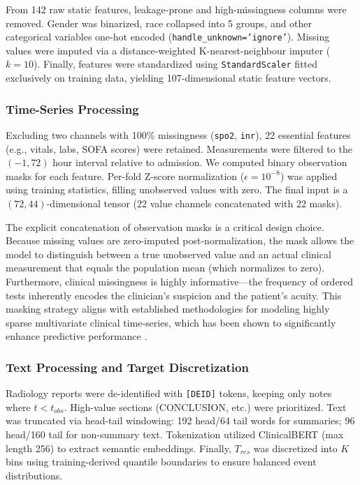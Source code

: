 \documentclass[10pt, a4paper]{article}
\begin{document}
From 142 raw static features, leakage-prone and high-missingness columns were removed. Gender was binarized, race collapsed into 5 groups, and other categorical variables one-hot encoded (\texttt{handle\_unknown='ignore'}). Missing values were imputed via a distance-weighted K-nearest-neighbour imputer ($k = 10$). Finally, features were standardized using \texttt{StandardScaler} fitted exclusively on training data, yielding 107-dimensional static feature vectors.

\subsubsection{Time-Series Processing}
Excluding two channels with 100\% missingness (\texttt{spo2}, \texttt{inr}), 22 essential features (e.g., vitals, labs, SOFA scores) were retained. Measurements were filtered to the $(-1, 72)$ hour interval relative to admission. We computed binary observation masks for each feature. Per-fold Z-score normalization ($\epsilon = 10^{-8}$) was applied using training statistics, filling unobserved values with zero. The final input is a $(72, 44)$-dimensional tensor (22 value channels concatenated with 22 masks).

The explicit concatenation of observation masks is a critical design choice. Because missing values are zero-imputed post-normalization, the mask allows the model to distinguish between a true unobserved value and an actual clinical measurement that equals the population mean (which normalizes to zero). Furthermore, clinical missingness is highly informative—the frequency of ordered tests inherently encodes the clinician's suspicion and the patient's acuity. This masking strategy aligns with established methodologies for modeling highly sparse multivariate clinical time-series, which has been shown to significantly enhance predictive performance \cite{lipton2016directly, che2018recurrent}.

\subsubsection{Text Processing and Target Discretization}
Radiology reports were de-identified with \texttt{[DEID]} tokens, keeping only notes where $t < t_{obs}$. High-value sections (CONCLUSION, etc.) were prioritized. Text was truncated via head-tail windowing: 192 head/64 tail words for summaries; 96 head/160 tail for non-summary text. Tokenization utilized ClinicalBERT (max length 256) to extract semantic embeddings. Finally, $T_{res}$ was discretized into $K$ bins using training-derived quantile boundaries to ensure balanced event distributions.
\end{document}
